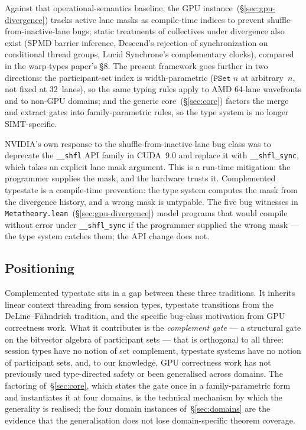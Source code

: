 \documentclass[acmsmall,screen,review,anonymous,nonacm]{acmart}
\newcommand{\PSet}{\texttt{PSet}}
\begin{document}
Against that operational-semantics baseline, the GPU instance~(\S\ref{sec:gpu-divergence}) tracks active lane masks as compile-time indices to prevent shuffle-from-inactive-lane bugs; static treatments of collectives under divergence also exist (SPMD barrier inference, Descend's rejection of synchronization on conditional thread groups, Lucid Synchrone's complementary clocks), compared in the warp-types paper's §8. The present framework goes further in two directions: the participant-set index is width-parametric ($\PSet\;n$ at arbitrary~$n$, not fixed at 32~lanes), so the same typing rules apply to AMD 64-lane wavefronts and to non-GPU domains; and the generic core~(\S\ref{sec:core}) factors the merge and extract gates into family-parametric rules, so the type system is no longer SIMT-specific.

NVIDIA's own response to the shuffle-from-inactive-lane bug class was to deprecate the \texttt{\_\_shfl} API family in CUDA~9.0 and replace it with \texttt{\_\_shfl\_sync}, which takes an explicit lane mask argument. This is a run-time mitigation: the programmer supplies the mask, and the hardware trusts it. Complemented typestate is a compile-time prevention: the type system computes the mask from the divergence history, and a wrong mask is untypable. The five bug witnesses in \texttt{Metatheory.lean}~(\S\ref{sec:gpu-divergence}) model programs that would compile without error under \texttt{\_\_shfl\_sync} if the programmer supplied the wrong mask --- the type system catches them; the API change does not.

\subsection{Positioning}\label{sec:positioning}

Complemented typestate sits in a gap between these three traditions. It inherits linear context threading from session types, typestate transitions from the DeLine--F\"ahndrich tradition, and the specific bug-class motivation from GPU correctness work. What it contributes is the \emph{complement gate} --- a structural gate on the bitvector algebra of participant sets --- that is orthogonal to all three: session types have no notion of set complement, typestate systems have no notion of participant sets, and, to our knowledge, GPU correctness work has not previously used type-directed safety or been generalised across domains. The factoring of~\S\ref{sec:core}, which states the gate once in a family-parametric form and instantiates it at four domains, is the technical mechanism by which the generality is realised; the four domain instances of~\S\ref{sec:domains} are the evidence that the generalisation does not lose domain-specific theorem coverage.
\end{document}
